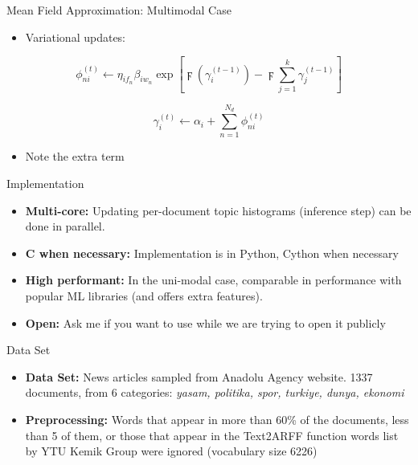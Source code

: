 \documentclass[pdf]{beamer}
\begin{document}
\begin{frame}{Mean Field Approximation: Multimodal Case}
	\begin{itemize}
		\item Variational updates:
	\end{itemize}
	\begin{equation*}
		\phi_{ni}^{(t)} \gets \eta_{i f_n} \beta_{i w_n} \exp\left[\digamma(\gamma_{i}^{(t-1)}) - \digamma{\sum_{j=1}^k \gamma_j^{(t-1)}}\right]
	\end{equation*}
	
	\begin{equation*}
		\gamma_i^{(t)}\gets \alpha_i + \sum_{n=1}^{N_d} \phi_{ni}^{(t)}
	\end{equation*}
	\begin{itemize}
		\item Note the extra term
	\end{itemize}

\end{frame}

\begin{frame}{Implementation}
	\begin{itemize}
		\item {\bf Multi-core:} Updating per-document topic histograms (inference step) can be done in parallel. 
		\item {\bf C when necessary:} Implementation is in Python, Cython when necessary
		\item {\bf High performant:} In the uni-modal case, comparable in performance with popular ML libraries (and offers extra features).
		\item {\bf Open:} Ask me if you want to use while we are trying to open it publicly
	\end{itemize}
\end{frame}


\begin{frame}{Data Set}
	
	\begin{itemize}
		\item {\bf Data Set:} News articles sampled from Anadolu Agency website. 1337 documents, from 6 categories: \textit{yasam, politika, spor, turkiye, dunya, ekonomi}
		\item {\bf Preprocessing:} Words that appear in more than 60\% of the documents, less than 5 of them, or those that appear in the Text2ARFF function words list by YTU Kemik Group were ignored (vocabulary size 6226)
	\end{itemize}
	
\end{frame}
\end{document}
